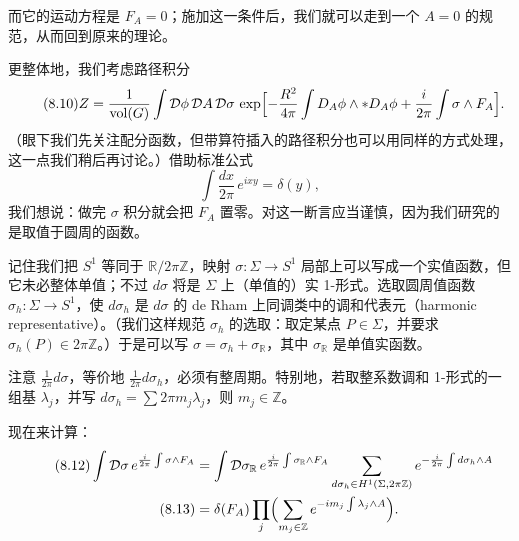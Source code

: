 而它的运动方程是 $F_A=0$；施加这一条件后，我们就可以走到一个 $A=0$ 的规范，从而回到原来的理论。

更整体地，我们考虑路径积分
\begin{equation}
  \tag{8.10}
  \label{eq:8-10}
  Z=\frac{1}{\mathrm{vol}(G)}\int\mathcal{D}\phi\,\mathcal{D}A\,\mathcal{D}\sigma\,
  \exp\Bigl[-\frac{R^2}{4\pi}\int D_A\phi\wedge\ast D_A\phi+\frac{i}{2\pi}\int\sigma\wedge F_A\Bigr].
\end{equation}
（眼下我们先关注配分函数，但带算符插入的路径积分也可以用同样的方式处理，这一点我们稍后再讨论。）借助标准公式
\begin{equation}
  \tag{8.11}
  \label{eq:8-11}
  \int\frac{dx}{2\pi}\,e^{ixy}=\delta(y),
\end{equation}
我们想说：做完 $\sigma$ 积分就会把 $F_A$ 置零。对这一断言应当谨慎，因为我们研究的是取值于圆周的函数。


记住我们把 $S^1$ 等同于 $\mathbb{R}/2\pi\mathbb{Z}$，映射 $\sigma:\Sigma\to S^1$ 局部上可以写成一个实值函数，但它未必整体单值；不过 $d\sigma$ 将是 $\Sigma$ 上（单值的）实 1-形式。选取圆周值函数 $\sigma_h:\Sigma\to S^1$，使 $d\sigma_h$ 是 $d\sigma$ 的 de Rham 上同调类中的调和代表元（harmonic representative）。（我们这样规范 $\sigma_h$ 的选取：取定某点 $P\in\Sigma$，并要求 $\sigma_h(P)\in2\pi\mathbb{Z}$。）于是可以写 $\sigma=\sigma_h+\sigma_{\mathbb{R}}$，其中 $\sigma_{\mathbb{R}}$ 是单值实函数。

注意 $\frac{1}{2\pi}d\sigma$，等价地 $\frac{1}{2\pi}d\sigma_h$，必须有整周期。特别地，若取整系数调和 1-形式的一组基 $\lambda_j$，并写 $d\sigma_h=\sum2\pi m_j\lambda_j$，则 $m_j\in\mathbb{Z}$。

现在来计算：
\begin{align}
  \tag{8.12}
  \label{eq:8-12}
  \int\mathcal{D}\sigma\,e^{\frac{i}{2\pi}\int\sigma\wedge F_A}
  &=\int\mathcal{D}\sigma_{\mathbb{R}}\,e^{\frac{i}{2\pi}\int\sigma_{\mathbb{R}}\wedge F_A}
  \sum_{d\sigma_h\in H^1(\Sigma,2\pi\mathbb{Z})}e^{-\frac{i}{2\pi}\int d\sigma_h\wedge A}\\
  \tag{8.13}
  \label{eq:8-13}
  &=\delta(F_A)\prod_j\Bigl(\sum_{m_j\in\mathbb{Z}}e^{-im_j\int\lambda_j\wedge A}\Bigr).
\end{align}

